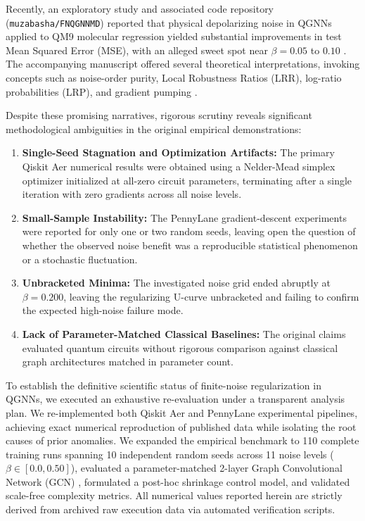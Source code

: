 \documentclass[sn-apacite,Numbered]{sn-jnl}
\begin{document}
Recently, an exploratory study and associated code repository (\texttt{muzabasha/FNQGNNMD}) reported that physical depolarizing noise in QGNNs applied to QM9 molecular regression yielded substantial improvements in test Mean Squared Error (MSE), with an alleged sweet spot near $\beta = 0.05$ to $0.10$ \cite{fnqgnnmd_repo}. The accompanying manuscript offered several theoretical interpretations, invoking concepts such as noise-order purity, Local Robustness Ratios (LRR), log-ratio probabilities (LRP), and gradient pumping \cite{seo2026multivariate,chen2026superior,riascosmoreno2025pulse}.

Despite these promising narratives, rigorous scrutiny reveals significant methodological ambiguities in the original empirical demonstrations:
\begin{enumerate}
    \item \textbf{Single-Seed Stagnation and Optimization Artifacts:} The primary Qiskit Aer numerical results were obtained using a Nelder-Mead simplex optimizer initialized at all-zero circuit parameters, terminating after a single iteration with zero gradients across all noise levels.
    \item \textbf{Small-Sample Instability:} The PennyLane gradient-descent experiments were reported for only one or two random seeds, leaving open the question of whether the observed noise benefit was a reproducible statistical phenomenon or a stochastic fluctuation.
    \item \textbf{Unbracketed Minima:} The investigated noise grid ended abruptly at $\beta = 0.200$, leaving the regularizing U-curve unbracketed and failing to confirm the expected high-noise failure mode.
    \item \textbf{Lack of Parameter-Matched Classical Baselines:} The original claims evaluated quantum circuits without rigorous comparison against classical graph architectures matched in parameter count.
\end{enumerate}

To establish the definitive scientific status of finite-noise regularization in QGNNs, we executed an exhaustive re-evaluation under a transparent analysis plan. We re-implemented both Qiskit Aer and PennyLane experimental pipelines, achieving exact numerical reproduction of published data while isolating the root causes of prior anomalies. We expanded the empirical benchmark to 110 complete training runs spanning 10 independent random seeds across 11 noise levels ($\beta \in [0.0, 0.50]$), evaluated a parameter-matched 2-layer Graph Convolutional Network (GCN) \cite{kipf2017semi}, formulated a post-hoc shrinkage control model, and validated scale-free complexity metrics. All numerical values reported herein are strictly derived from archived raw execution data via automated verification scripts.
\end{document}
